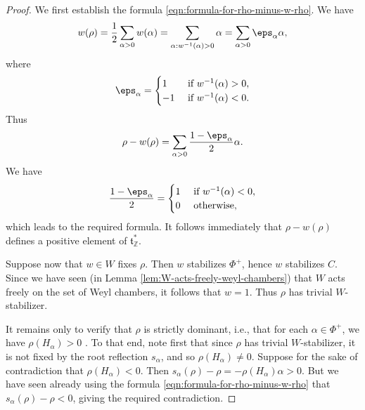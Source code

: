 \documentclass[reqno]{amsart} 
\begin{document}
\begin{proof}
  We first establish the formula \eqref{eqn:formula-for-rho-minus-w-rho}.  We have
  \begin{equation*}
    w(\rho) = \frac{1}{2} \sum_{\alpha > 0} w(\alpha) = \sum_{\alpha: w^{-1}(\alpha) > 0} \alpha = \sum_{\alpha > 0} \eps_\alpha \alpha,
  \end{equation*}
  where
  \begin{equation*}
    \eps_\alpha =
    \begin{cases}
      1 & \text{ if }
      w^{-1}(\alpha) > 0, \\
      -1 & \text{ if } w^{-1}(\alpha) < 0.
    \end{cases}
  \end{equation*}
  Thus
  \begin{equation*}
    \rho - w(\rho) = \sum _{\alpha > 0} \frac{1 - \eps_\alpha }{2} \alpha.
  \end{equation*}
  We have
  \begin{equation*}
    \frac{1 - \eps_\alpha }{2} =
    \begin{cases}
      1 & \text{ if } w^{-1}(\alpha) < 0, \\
      0 & \text{ otherwise},
    \end{cases}
  \end{equation*}
  which leads to the required formula.  It follows immediately that $\rho - w(\rho)$ defines a positive element of $\mathfrak{t}_{\mathbb{Z}}^*$.
  
  Suppose now that $w \in W$ fixes $\rho$.  Then $w$ stabilizes $\Phi^+$, hence $w$ stabilizes $C$.  Since we have seen (in Lemma \ref{lem:W-acts-freely-weyl-chambers}) that $W$ acts freely on the set of Weyl chambers, it follows that $w = 1$.  Thus $\rho$ has trivial $W$-stabilizer.

  It remains only to verify that $\rho$ is strictly dominant, i.e., that for each $\alpha \in \Phi^+$, we have $\rho(H_\alpha) > 0$ .  To that end, note first that since $\rho$ has trivial $W$-stabilizer, it is not fixed by the root reflection $s_\alpha$, and so $\rho(H_\alpha) \neq 0$.  Suppose for the sake of contradiction that $\rho(H_\alpha) < 0$.  Then $s_\alpha(\rho) - \rho = - \rho(H_\alpha) \alpha > 0$.  But we have seen already using the formula \eqref{eqn:formula-for-rho-minus-w-rho} that $s_\alpha(\rho) - \rho < 0$, giving the required contradiction.
\end{proof}
\end{document}

